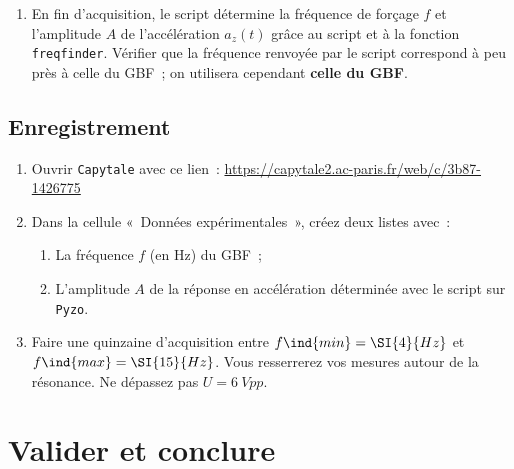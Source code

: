 \documentclass[../main/main.tex]{subfiles}
\begin{document}
{\begin{tcb}[breakable]
\begin{enumerate}
\begin{center}
\begin{tcb}[width=.9\linewidth]
\begin{itemize}
						            appuyer sur \texttt{Ctrl + k} afin de réinitialiser le
						            shell.
					      \end{itemize}
				      \end{tcb}
			      \end{center}
			\item En fin d'acquisition, le script détermine la fréquence de forçage
			      $f$ et l'amplitude $A$ de l'accélération $a_z(t)$ grâce au script et
			      à la fonction \texttt{freqfinder}. Vérifier que la fréquence
			      renvoyée par le script correspond à peu près à celle du GBF~; on
			      utilisera cependant \textbf{celle du GBF}.
		\end{enumerate}
	\end{tcb}

	\subsection{Enregistrement}

	\begin{enumerate}
		\item Ouvrir \texttt{Capytale} avec ce lien~:
		      \url{https://capytale2.ac-paris.fr/web/c/3b87-1426775}
		\item Dans la cellule «~Données expérimentales~», créez deux listes avec~:
		      \begin{enumerate}
			      \item La fréquence $f$ (en \si{Hz}) du GBF~;
			      \item L'amplitude $A$ de la réponse en accélération déterminée avec
			            le script sur \texttt{Pyzo}.
		      \end{enumerate}
		\item Faire une quinzaine d'acquisition entre $f\ind{min} = \SI{4}{Hz}$ et
		      $f\ind{max} = \SI{15}{Hz}$. Vous resserrerez vos mesures autour de
		      la résonance. Ne dépassez pas $U = \SI{6}{Vpp}$.
	\end{enumerate}
}

\setcounter{section}{3}
\section{Valider et conclure}
\end{document}
